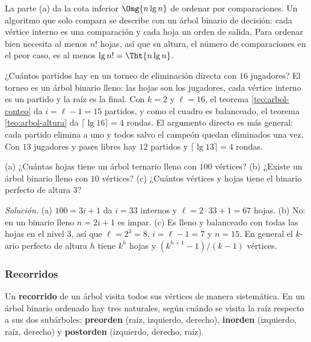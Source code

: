 \documentclass[11pt,letterpaper]{article}
\begin{document}
\begin{observacion}
  La parte (a) da la cota inferior $\Omg{n \lg n}$ de ordenar por
  comparaciones. Un algoritmo que solo compara se describe con un
  árbol binario de decisión: cada vértice interno es una comparación y
  cada hoja un orden de salida. Para ordenar bien necesita al menos
  $n!$ hojas, así que su altura, el número de comparaciones en el peor
  caso, es al menos $\lg n! = \Tht{n \lg n}$.
\end{observacion}

\begin{ejemplo}
  \label{ej:arbol-torneo}
  ¿Cuántos partidos hay en un torneo de eliminación directa con $16$
  jugadores? El torneo es un árbol binario lleno: las hojas son los
  jugadores, cada vértice interno es un partido y la raíz es la
  final. Con $k = 2$ y $\ell = 16$, el teorema \ref{teo:arbol-conteo}
  da $i = \ell - 1 = 15$ partidos, y como el cuadro es balanceado, el
  teorema \ref{teo:arbol-altura} da $\lceil \lg 16 \rceil = 4$ rondas.
  El argumento directo es más general: cada partido elimina a uno y
  todos salvo el campeón quedan eliminados una vez. Con $13$ jugadores
  y pases libres hay $12$ partidos y $\lceil \lg 13 \rceil = 4$
  rondas.
\end{ejemplo}

\begin{ejercicio}
  \label{ej:arbol-existe}
  (a) ¿Cuántas hojas tiene un árbol ternario lleno con $100$
  vértices? (b) ¿Existe un árbol binario lleno con $10$ vértices?
  (c) ¿Cuántos vértices y hojas tiene el binario perfecto de altura
  $3$?

  \textit{Solución.} (a) $100 = 3i + 1$ da $i = 33$ internos y
  $\ell = 2 \cdot 33 + 1 = 67$ hojas. (b) No: en un binario lleno
  $n = 2i + 1$ es impar. (c) Es lleno y balanceado con todas las hojas
  en el nivel $3$, así que $\ell = 2^3 = 8$, $i = \ell - 1 = 7$ y
  $n = 15$. En general el $k$-ario perfecto de altura $h$ tiene
  $k^h$ hojas y $(k^{h+1} - 1)/(k - 1)$ vértices.
\end{ejercicio}


\subsubsection*{Recorridos}

Un \textbf{recorrido} de un árbol visita todos sus vértices de manera
sistemática. En un árbol binario ordenado hay tres naturales, según
cuándo se visita la raíz respecto a sus dos subárboles:
\textbf{preorden} (raíz, izquierdo, derecho), \textbf{inorden}
(izquierdo, raíz, derecho) y \textbf{postorden} (izquierdo, derecho,
raíz).
\end{document}

